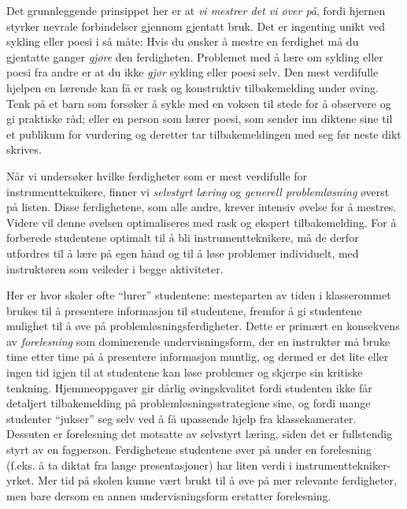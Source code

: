 \vskip 10pt

Det grunnleggende prinsippet her er at {\it vi mestrer det vi øver på}, fordi hjernen styrker nevrale forbindelser gjennom gjentatt bruk.  Det er ingenting unikt ved sykling eller poesi i så måte: Hvis du ønsker å mestre en ferdighet må du gjentatte ganger {\it gjøre} den ferdigheten.  Problemet med å lære om sykling eller poesi fra andre er at du ikke {\it gjør} sykling eller poesi selv.  Den mest verdifulle hjelpen en lærende kan få er rask og konstruktiv tilbakemelding under øving.  Tenk på et barn som forsøker å sykle med en voksen til stede for å observere og gi praktiske råd; eller en person som lærer poesi, som sender inn diktene sine til et publikum for vurdering og deretter tar tilbakemeldingen med seg før neste dikt skrives.

Når vi undersøker hvilke ferdigheter som er mest verdifulle for instrumentteknikere, finner vi {\it selvstyrt læring} og {\it generell problemløsning} øverst på listen.  Disse ferdighetene, som alle andre, krever intensiv øvelse for å mestres.  Videre vil denne øvelsen optimaliseres med rask og ekspert tilbakemelding.  For å forberede studentene optimalt til å bli instrumentteknikere, må de derfor utfordres til å lære på egen hånd og til å løse problemer individuelt, med instruktøren som veileder i begge aktiviteter.

Her er hvor skoler ofte ``lurer'' studentene: mesteparten av tiden i klasserommet brukes til å presentere informasjon til studentene, fremfor å gi studentene mulighet til å øve på problemløsningsferdigheter.  Dette er primært en konsekvens av {\it forelesning} som dominerende undervisningsform, der en instruktør må bruke time etter time på å presentere informasjon muntlig, og dermed er det lite eller ingen tid igjen til at studentene kan løse problemer og skjerpe sin kritiske tenkning.  Hjemmeoppgaver gir dårlig øvingskvalitet fordi studenten ikke får detaljert tilbakemelding på problemløsningsstrategiene sine, og fordi mange studenter ``jukser'' seg selv ved å få upassende hjelp fra klassekamerater.  Dessuten er forelesning det motsatte av selvstyrt læring, siden det er fullstendig styrt av en fagperson.  Ferdighetene studentene øver på under en forelesning (f.eks. å ta diktat fra lange presentasjoner) har liten verdi i instrumenttekniker-yrket.  Mer tid på skolen kunne vært brukt til å øve på mer relevante ferdigheter, men bare dersom en annen undervisningsform erstatter forelesning.

\vfil \eject

